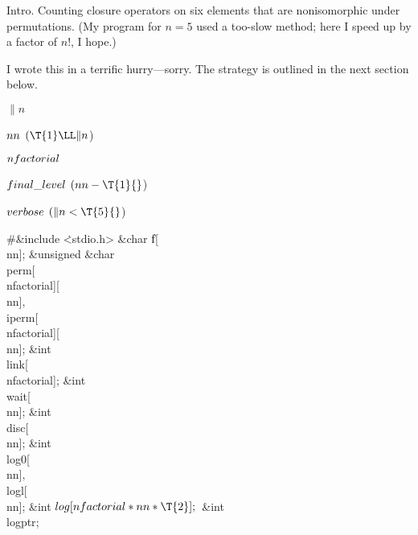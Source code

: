 
\hypertextrue\srcloctrue
\datethis


Intro. Counting closure operators on six elements that
are nonisomorphic
under permutations. (My program for $n=5$ used a too-slow method;
here I speed up by a factor of $n!$, I hope.)

I wrote this in a terrific hurry---sorry. The strategy is outlined
in the next section below.

\Y\B\4\D$\|n$ \5
\par
\B\4\D$\\{nn}$ \5
$(\T{1}\LL\|n{}$)\par
\B\4\D$\\{nfactorial}$ \5
\par
\B\4\D$\\{final\_level}$ \5
$(\\{nn}-\T{1}{}$)\par
\B\4\D$\\{verbose}$ \5
$(\|n<\T{5}{}$)\par
\Y\B\8\#\&{include} \.{<stdio.h>}\6
\&{char} \|f[\\{nn}];\6
\&{unsigned} \&{char} \\{perm}[\\{nfactorial}][\\{nn}]${},{}$ \\{iperm}[%
\\{nfactorial}][\\{nn}];\6
\&{int} \\{link}[\\{nfactorial}];\6
\&{int} \\{wait}[\\{nn}];\6
\&{int} \\{disc}[\\{nn}];\6
\&{int} \\{log0}[\\{nn}]${},{}$ \\{logl}[\\{nn}];\6
\&{int} ${}\\{log}[\\{nfactorial}*\\{nn}*\T{2}];{}$\6
\&{int} \\{logptr};\6
